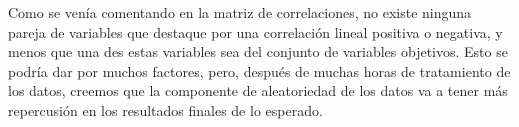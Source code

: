 Como se venía comentando en la matriz de correlaciones, no existe ninguna pareja de variables que destaque por una correlación lineal positiva o negativa, y menos que una des estas variables sea del conjunto de variables objetivos. Esto se podría dar por muchos factores, pero, después de muchas horas de tratamiento de los datos, creemos que la componente de aleatoriedad de los datos va a tener más repercusión en los resultados finales de lo esperado.
\newline




\newpage